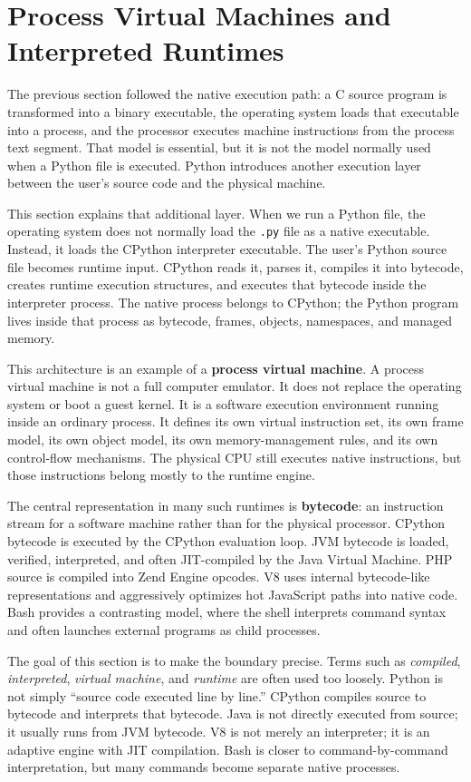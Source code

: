 \section{Process Virtual Machines and Interpreted Runtimes}

The previous section followed the native execution path: a C source program is transformed into a binary executable, the operating system loads that executable into a process, and the processor executes machine instructions from the process text segment. That model is essential, but it is not the model normally used when a Python file is executed. Python introduces another execution layer between the user's source code and the physical machine.

This section explains that additional layer. When we run a Python file, the operating system does not normally load the \texttt{.py} file as a native executable. Instead, it loads the CPython interpreter executable. The user's Python source file becomes runtime input. CPython reads it, parses it, compiles it into bytecode, creates runtime execution structures, and executes that bytecode inside the interpreter process. The native process belongs to CPython; the Python program lives inside that process as bytecode, frames, objects, namespaces, and managed memory.

This architecture is an example of a \textbf{process virtual machine}. A process virtual machine is not a full computer emulator. It does not replace the operating system or boot a guest kernel. It is a software execution environment running inside an ordinary process. It defines its own virtual instruction set, its own frame model, its own object model, its own memory-management rules, and its own control-flow mechanisms. The physical CPU still executes native instructions, but those instructions belong mostly to the runtime engine.

The central representation in many such runtimes is \textbf{bytecode}: an instruction stream for a software machine rather than for the physical processor. CPython bytecode is executed by the CPython evaluation loop. JVM bytecode is loaded, verified, interpreted, and often JIT-compiled by the Java Virtual Machine. PHP source is compiled into Zend Engine opcodes. V8 uses internal bytecode-like representations and aggressively optimizes hot JavaScript paths into native code. Bash provides a contrasting model, where the shell interprets command syntax and often launches external programs as child processes.

The goal of this section is to make the boundary precise. Terms such as \emph{compiled}, \emph{interpreted}, \emph{virtual machine}, and \emph{runtime} are often used too loosely. Python is not simply ``source code executed line by line.'' CPython compiles source to bytecode and interprets that bytecode. Java is not directly executed from source; it usually runs from JVM bytecode. V8 is not merely an interpreter; it is an adaptive engine with JIT compilation. Bash is closer to command-by-command interpretation, but many commands become separate native processes.

